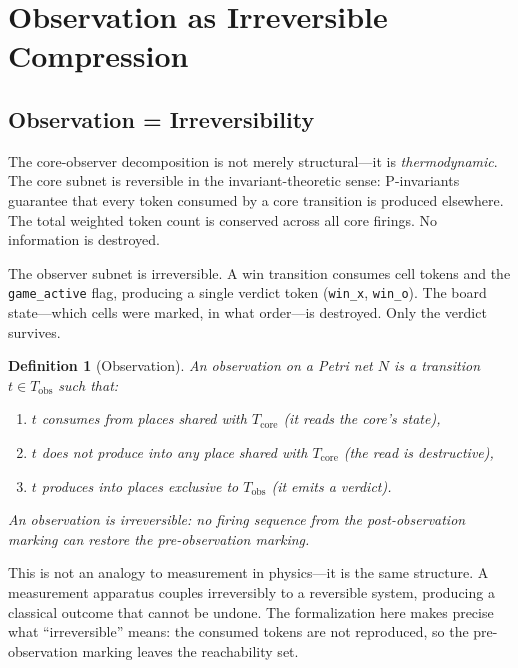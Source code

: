 \documentclass[11pt,a4paper]{article}
\newtheorem{definition}[theorem]{Definition}
\begin{document}
\section{Observation as Irreversible Compression}
\label{sec:observer}

\subsection{Observation = Irreversibility}

The core-observer decomposition is not merely structural---it is \emph{thermodynamic}.
The core subnet is reversible in the invariant-theoretic sense: P-invariants guarantee that every token consumed by a core transition is produced elsewhere.
The total weighted token count is conserved across all core firings.
No information is destroyed.

The observer subnet is irreversible.
A win transition consumes cell tokens and the \texttt{game\_active} flag, producing a single verdict token (\texttt{win\_x}, \texttt{win\_o}).
The board state---which cells were marked, in what order---is destroyed.
Only the verdict survives.

\begin{definition}[Observation]
\label{def:observation}
An \emph{observation} on a Petri net $N$ is a transition $t \in T_{\mathrm{obs}}$ such that:
\begin{enumerate}
  \item $t$ consumes from places shared with $T_{\mathrm{core}}$ (it reads the core's state),
  \item $t$ does not produce into any place shared with $T_{\mathrm{core}}$ (the read is destructive),
  \item $t$ produces into places exclusive to $T_{\mathrm{obs}}$ (it emits a verdict).
\end{enumerate}
An observation is \emph{irreversible}: no firing sequence from the post-observation marking can restore the pre-observation marking.
\end{definition}

This is not an analogy to measurement in physics---it is the same structure.
A measurement apparatus couples irreversibly to a reversible system, producing a classical outcome that cannot be undone.
The formalization here makes precise what ``irreversible'' means: the consumed tokens are not reproduced, so the pre-observation marking leaves the reachability set.
\end{document}
